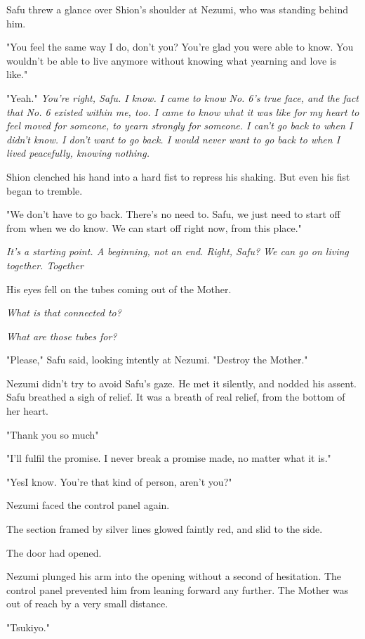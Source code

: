 Safu threw a glance over Shion's shoulder at Nezumi, who was standing
behind him.

"You feel the same way I do, don't you? You're glad you were able to
know. You wouldn't be able to live anymore without knowing what yearning
and love is like."

"\el Yeah." \emph{You're right, Safu. I know. I came to know No. 6's true face,
and the fact that No. 6 existed within me, too. I came to know what it
was like for my heart to feel moved for someone, to yearn strongly for
someone. I can't go back to when I didn't know. I don't want to go back.
I would never want to go back to when I lived peacefully, knowing
nothing.}

Shion clenched his hand into a hard fist to repress his shaking. But
even his fist began to tremble.

"We don't have to go back. There's no need to. Safu, we just need to
start off from when we do know. We can start off right now, from this
place."

\emph{It's a starting point. A beginning, not an end. Right, Safu? We can go
on living together. Together\el }

His eyes fell on the tubes coming out of the Mother.

\emph{What is that connected to?}

\emph{What are those tubes for?}

"Please," Safu said, looking intently at Nezumi. "Destroy the Mother."

Nezumi didn't try to avoid Safu's gaze. He met it silently, and nodded
his assent. Safu breathed a sigh of relief. It was a breath of real
relief, from the bottom of her heart.

"Thank you so much\el "

"I'll fulfil the promise. I never break a promise made, no matter what
it is."

"Yes\el I know. You're that kind of person, aren't you?"

Nezumi faced the control panel again.

The section framed by silver lines glowed faintly red, and slid to the
side.

The door had opened.

Nezumi plunged his arm into the opening without a second of hesitation.
The control panel prevented him from leaning forward any further. The
Mother was out of reach by a very small distance.

"Tsukiyo."

